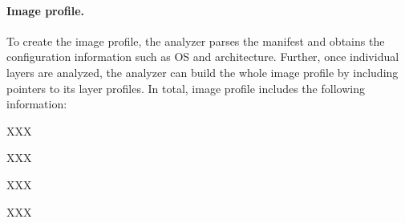 

%



\paragraph{Image profile.}

To create the image profile, the analyzer parses the manifest
and obtains the configuration information such as OS and architecture.
Further, once individual layers are analyzed, the analyzer can build the whole image
profile by including pointers to its layer profiles. In total, image profile includes
the following information:

\begin{compactitemize}
	\item XXX
	\item XXX
	\item XXX
	\item XXX
\end{compactitemize}


%

